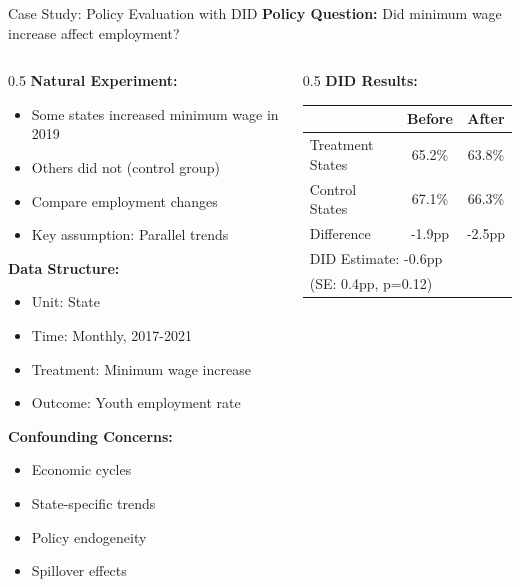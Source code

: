 \documentclass[aspectratio=169,11pt]{beamer}
\begin{document}
\begin{frame}{Case Study: Policy Evaluation with DID}
\textbf{Policy Question:} Did minimum wage increase affect employment?

\begin{columns}
\begin{column}{0.5\textwidth}
\textbf{Natural Experiment:}
\begin{itemize}
\item Some states increased minimum wage in 2019
\item Others did not (control group)
\item Compare employment changes
\item Key assumption: Parallel trends
\end{itemize}

\vspace{0.3cm}
\textbf{Data Structure:}
\begin{itemize}
\item Unit: State
\item Time: Monthly, 2017-2021
\item Treatment: Minimum wage increase
\item Outcome: Youth employment rate
\end{itemize}

\vspace{0.3cm}
\textbf{Confounding Concerns:}
\begin{itemize}
\item Economic cycles
\item State-specific trends
\item Policy endogeneity
\item Spillover effects
\end{itemize}
\end{column}
\begin{column}{0.5\textwidth}
\textbf{DID Results:}

\begin{table}
\centering
\small
\begin{tabular}{lcc}
\toprule
& \textbf{Before} & \textbf{After} \\
\midrule
Treatment States & 65.2\% & 63.8\% \\
Control States & 67.1\% & 66.3\% \\
\midrule
Difference & -1.9pp & -2.5pp \\
\midrule
\multicolumn{3}{l}{DID Estimate: -0.6pp} \\
\multicolumn{3}{l}{(SE: 0.4pp, p=0.12)} \\
\bottomrule
\end{tabular}
\end{table}


\end{column}
\end{columns}
\end{frame}
\end{document}

